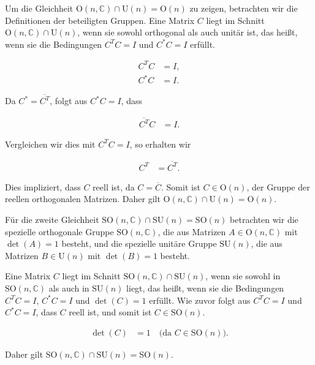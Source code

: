 Um die Gleichheit $\mathrm{O}(n, \mathbb{C}) \cap \mathrm{U}(n) = \mathrm{O}(n)$ zu zeigen, betrachten wir die Definitionen der beteiligten Gruppen. Eine Matrix $C$ liegt im Schnitt $\mathrm{O}(n, \mathbb{C}) \cap \mathrm{U}(n)$, wenn sie sowohl orthogonal als auch unitär ist, das heißt, wenn sie die Bedingungen $C^T C = I$ und $C^* C = I$ erfüllt. 

\begin{align*}
C^T C &= I, \\
C^* C &= I.
\end{align*}

Da $C^* = \overline{C^T}$, folgt aus $C^* C = I$, dass

\begin{align*}
\overline{C^T} C &= I.
\end{align*}

Vergleichen wir dies mit $C^T C = I$, so erhalten wir

\begin{align*}
C^T &= \overline{C^T}.
\end{align*}

Dies impliziert, dass $C$ reell ist, da $C = \overline{C}$. Somit ist $C \in \mathrm{O}(n)$, der Gruppe der reellen orthogonalen Matrizen. Daher gilt $\mathrm{O}(n, \mathbb{C}) \cap \mathrm{U}(n) = \mathrm{O}(n)$.

Für die zweite Gleichheit $\mathrm{SO}(n, \mathbb{C}) \cap \mathrm{SU}(n) = \mathrm{SO}(n)$ betrachten wir die spezielle orthogonale Gruppe $\mathrm{SO}(n, \mathbb{C})$, die aus Matrizen $A \in \mathrm{O}(n, \mathbb{C})$ mit $\det(A) = 1$ besteht, und die spezielle unitäre Gruppe $\mathrm{SU}(n)$, die aus Matrizen $B \in \mathrm{U}(n)$ mit $\det(B) = 1$ besteht.

Eine Matrix $C$ liegt im Schnitt $\mathrm{SO}(n, \mathbb{C}) \cap \mathrm{SU}(n)$, wenn sie sowohl in $\mathrm{SO}(n, \mathbb{C})$ als auch in $\mathrm{SU}(n)$ liegt, das heißt, wenn sie die Bedingungen $C^T C = I$, $C^* C = I$ und $\det(C) = 1$ erfüllt. Wie zuvor folgt aus $C^T C = I$ und $C^* C = I$, dass $C$ reell ist, und somit ist $C \in \mathrm{SO}(n)$.

\begin{align*}
\det(C) &= 1 \quad \text{(da $C \in \mathrm{SO}(n)$)}.
\end{align*}

Daher gilt $\mathrm{SO}(n, \mathbb{C}) \cap \mathrm{SU}(n) = \mathrm{SO}(n)$.

